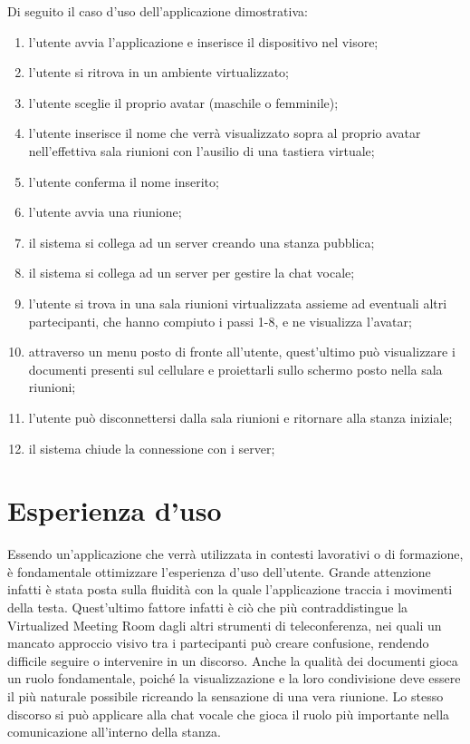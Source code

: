 Di seguito il  caso d'uso dell'applicazione dimostrativa:
\begin{enumerate}
	\item l'utente avvia l'applicazione e inserisce il dispositivo nel visore;
	\item l'utente si ritrova in un ambiente virtualizzato;
	\item l'utente sceglie il proprio avatar (maschile o femminile);
	\item l'utente inserisce il nome che verrà visualizzato sopra al proprio avatar nell'effettiva sala riunioni con l'ausilio di una tastiera virtuale;
	\item l'utente conferma il nome inserito;
	\item l'utente avvia una riunione;
	\item il sistema si collega ad un server creando una stanza pubblica; 
	\item il sistema si collega ad un server per gestire la chat vocale;
	\item l'utente si trova in una sala riunioni virtualizzata assieme ad eventuali altri partecipanti, che hanno compiuto i passi 1-8, e ne visualizza l'avatar;
	\item attraverso un menu posto di fronte all'utente, quest'ultimo può visualizzare i documenti presenti sul cellulare e proiettarli sullo schermo posto nella sala riunioni;
	\item l'utente può disconnettersi dalla sala riunioni e ritornare alla stanza iniziale;
	\item il sistema chiude la connessione con i server;
\end{enumerate}

\section{Esperienza d'uso}
Essendo un'applicazione che verrà utilizzata in contesti lavorativi o di formazione, è fondamentale ottimizzare l'esperienza d'uso dell'utente. Grande attenzione infatti è stata posta sulla fluidità con la quale l'applicazione traccia i movimenti della testa. Quest'ultimo fattore infatti è ciò che più contraddistingue la Virtualized Meeting Room dagli altri strumenti di teleconferenza, nei quali un mancato approccio visivo tra i partecipanti può creare confusione, rendendo difficile seguire o intervenire in un discorso. Anche la qualità dei documenti gioca un ruolo fondamentale, poiché la visualizzazione e la loro condivisione deve essere il più naturale possibile ricreando la sensazione di una vera riunione. Lo stesso discorso si può applicare alla chat vocale che gioca il ruolo più importante nella comunicazione all'interno della stanza.
